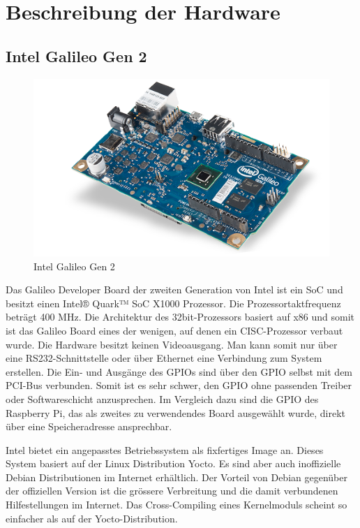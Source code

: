 \pagebreak
\section{Beschreibung der Hardware}
\label{beschreibung_hardware}
\subsection{Intel Galileo Gen 2}

\begin{figure}
\centering
\includegraphics[scale=0.5]{images/iot_galileo.png}
\caption{Intel Galileo Gen 2\cite{intel_galileo_image}}
\label{fig:Intel Galileo Gen2}
\end{figure}

Das Galileo Developer Board\cite{intel_datasheet_galileo} der zweiten Generation von
Intel ist ein SoC und besitzt einen Intel® Quark™ SoC X1000 Prozessor. Die Prozessortaktfrequenz beträgt 400 MHz. Die Architektur des 32bit-Prozessors basiert auf x86\cite{intel_datasheet} und somit ist das Galileo
Board eines der wenigen, auf denen ein CISC-Prozessor verbaut wurde. Die Hardware
besitzt keinen Videoausgang. Man kann somit nur über eine RS232-Schnittstelle oder über Ethernet
eine Verbindung zum System erstellen. Die Ein- und Ausgänge des GPIOs sind über den GPIO selbst mit dem
PCI-Bus verbunden. Somit ist es sehr schwer, den GPIO ohne passenden Treiber oder
Softwareschicht anzusprechen. Im Vergleich dazu sind die GPIO des Raspberry Pi, das als zweites zu verwendendes Board ausgewählt wurde, direkt über eine Speicheradresse ansprechbar.
\par
Intel bietet ein angepasstes Betriebssystem als fixfertiges Image an. Dieses System basiert auf
der Linux Distribution Yocto. Es sind aber auch inoffizielle Debian Distributionen im
Internet erhältlich. Der Vorteil von Debian gegenüber der offiziellen Version ist die
grössere Verbreitung und die damit verbundenen Hilfestellungen im Internet. Das Cross-Compiling eines Kernelmoduls scheint so einfacher als auf der Yocto-Distribution.


